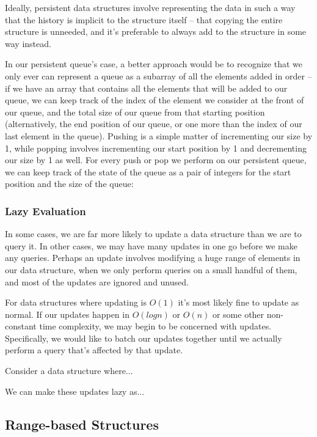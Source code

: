 Ideally, persistent data structures involve representing the data in such a way that the history is implicit to the structure itself -- that copying the entire structure is unneeded, and it's preferable to always add to the structure in some way instead.

In our persistent queue's case, a better approach would be to recognize that we only ever can represent a queue as a subarray of all the elements added in order -- if we have an array that contains all the elements that will be added to our queue, we can keep track of the index of the element we consider at the front of our queue, and the total size of our queue from that starting position (alternatively, the end position of our queue, or one more than the index of our last element in the queue). Pushing is a simple matter of incrementing our size by 1, while popping involves incrementing our start position by 1 and decrementing our size by 1 as well. For every push or pop we perform on our persistent queue, we can keep track of the state of the queue as a pair of integers for the start position and the size of the queue:


\subsubsection{Lazy Evaluation}

In some cases, we are far more likely to update a data structure than we are to query it. In other cases, we may have many updates in one go before we make any queries. Perhaps an update involves modifying a huge range of elements in our data structure, when we only perform queries on a small handful of them, and most of the updates are ignored and unused.

For data structures where updating is $O(1)$ it's most likely fine to update as normal. If our updates happen in $O(log n)$ or $O(n)$ or some other non-constant time complexity, we may begin to be concerned with updates. Specifically, we would like to batch our updates together until we actually perform a query that's affected by that update.

Consider a data structure where...

We can make these updates lazy as...

\subsection{Range-based Structures}
